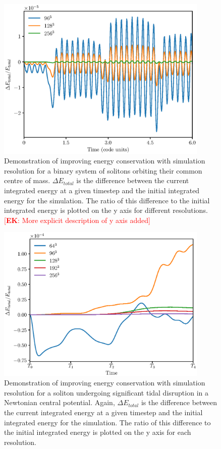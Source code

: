 \documentclass[a4paper,11pt]{article}
\newcommand{\ek}[1]{\textcolor{red}{[{\bf EK}: #1]}}
\begin{document}
\begin{figure}
  \includegraphics[width=0.9\textwidth,trim=0 0.5cm 0 0,clip]{Total_Energy_Change.eps}
  \caption{Demonstration of improving energy conservation with simulation resolution for a binary system of solitons orbiting their common centre of mass. $\Delta E_{total}$ is the difference between the current integrated energy at a given timestep and the initial integrated energy for the simulation. The ratio of this difference to the initial integrated energy is plotted on the y axis for different resolutions.\ek{More explicit description of y axis added}}
  \label{fig:energy_change}
\end{figure}

\begin{figure}
  \includegraphics[width=0.9\textwidth,trim=0 0.5cm 0 0,clip]{Total_Energy_Change_Disruption.eps}
  \caption{Demonstration of improving energy conservation with simulation resolution for a soliton undergoing significant tidal disruption in a Newtonian central potential. Again, $\Delta E_{total}$ is the difference between the current integrated energy at a given timestep and the initial integrated energy for the simulation. The ratio of this difference to the initial integrated energy is plotted on the y axis for each resolution.}
  \label{fig:energy_change_2}
\end{figure}
\end{document}
